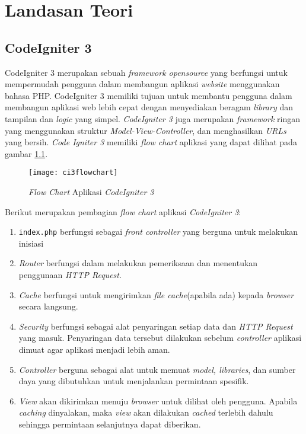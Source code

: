 \chapter{Landasan Teori}
\label{chap:teori}

\section{CodeIgniter 3\cite{ci3:22}}
\label{sec:ci3} 
 
CodeIgniter 3 merupakan sebuah \textit{framework opensource} yang berfungsi untuk mempermudah pengguna dalam membangun aplikasi \textit{website} menggunakan bahasa PHP. CodeIgniter 3 memiliki tujuan untuk membantu pengguna dalam membangun aplikasi web lebih cepat dengan menyediakan beragam \textit{library} dan tampilan dan \textit{logic} yang simpel. \textit{CodeIgniter 3} juga merupakan \textit{framework} ringan yang menggunakan struktur \textit{Model-View-Controller}, dan menghasilkan \textit{URLs} yang bersih. \textit{Code Igniter 3} memiliki \textit{flow chart} aplikasi yang dapat dilihat pada gambar \ref{fig:ci3flowchart}.

\begin{figure}[H]
	\centering  
	\texttt{[image: ci3flowchart]}  
	\caption[\textit{Flow Chart} Aplikasi \textit{CodeIgniter 3}]{\textit{Flow Chart} Aplikasi \textit{CodeIgniter 3}} 
	\label{fig:ci3flowchart} 
\end{figure} 

Berikut merupakan pembagian \textit{flow chart} aplikasi \textit{CodeIgniter 3}:
\begin{enumerate}
\item \texttt{index.php} berfungsi sebagai \textit{front controller} yang berguna untuk melakukan inisiasi
\item \textit{Router} berfungsi dalam melakukan pemeriksaan dan menentukan penggunaan \textit{HTTP Request}.
\item \textit{Cache} berfungsi untuk mengirimkan \textit{file cache}(apabila ada) kepada \textit{browser} secara langsung.   
\item \textit{Security} berfungsi sebagai alat penyaringan setiap data dan \textit{HTTP Request} yang masuk. Penyaringan data tersebut dilakukan sebelum \textit{controller} aplikasi dimuat agar aplikasi menjadi lebih aman.
\item \textit{Controller} berguna sebagai alat untuk memuat \textit{model, libraries}, dan sumber daya yang dibutuhkan untuk menjalankan permintaan spesifik.
\item \textit{View} akan dikirimkan menuju \textit{browser} untuk dilihat oleh pengguna. Apabila \textit{caching} dinyalakan, maka \textit{view} akan dilakukan \textit{cached} terlebih dahulu sehingga permintaan selanjutnya dapat diberikan.
\end{enumerate}

